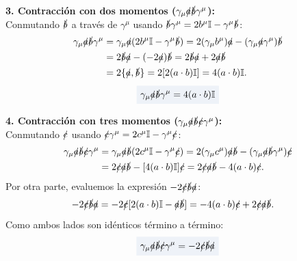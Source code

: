 \documentclass[10pt,a4paper]{article}
\newcommand{\dest}[1]{{\setlength{\fboxsep}{4pt}\colorbox{colordest}{$\displaystyle #1$}}}
\begin{document}
\textbf{3. Contracción con dos momentos ($\gamma_\mu \slashed{a} \slashed{b} \gamma^\mu$):}\\
Conmutando $\slashed{b}$ a través de $\gamma^\mu$ usando $\slashed{b} \gamma^\mu = 2 b^\mu \mathbb{I} - \gamma^\mu \slashed{b}$:
\begin{align}
\gamma_\mu \slashed{a} \slashed{b} \gamma^\mu &= \gamma_\mu \slashed{a} (2 b^\mu \mathbb{I} - \gamma^\mu \slashed{b}) = 2 (\gamma_\mu b^\mu) \slashed{a} - (\gamma_\mu \slashed{a} \gamma^\mu) \slashed{b} \nonumber \\
&= 2 \slashed{b} \slashed{a} - (-2 \slashed{a}) \slashed{b} = 2 \slashed{b} \slashed{a} + 2 \slashed{a} \slashed{b} \nonumber \\
&= 2 \{\slashed{a}, \slashed{b}\} = 2 [2 (a \cdot b) \mathbb{I}] = 4 (a \cdot b) \mathbb{I}.
\end{align}
\begin{equation}
\dest{\gamma_\mu \slashed{a} \slashed{b} \gamma^\mu = 4 (a \cdot b) \mathbb{I}}
\label{eq:clifford_contract_2}
\end{equation}

\textbf{4. Contracción con tres momentos ($\gamma_\mu \slashed{a} \slashed{b} \slashed{c} \gamma^\mu$):}\\
Conmutando $\slashed{c}$ usando $\slashed{c} \gamma^\mu = 2 c^\mu \mathbb{I} - \gamma^\mu \slashed{c}$:
\begin{align}
\gamma_\mu \slashed{a} \slashed{b} \slashed{c} \gamma^\mu &= \gamma_\mu \slashed{a} \slashed{b} (2 c^\mu \mathbb{I} - \gamma^\mu \slashed{c}) = 2 (\gamma_\mu c^\mu) \slashed{a} \slashed{b} - (\gamma_\mu \slashed{a} \slashed{b} \gamma^\mu) \slashed{c} \nonumber \\
&= 2 \slashed{c} \slashed{a} \slashed{b} - [4 (a \cdot b) \mathbb{I}] \slashed{c} = 2 \slashed{c} \slashed{a} \slashed{b} - 4 (a \cdot b) \slashed{c}.
\end{align}
Por otra parte, evaluemos la expresión $-2 \slashed{c} \slashed{b} \slashed{a}$:
\begin{align}
-2 \slashed{c} \slashed{b} \slashed{a} &= -2 \slashed{c} [2 (a \cdot b) \mathbb{I} - \slashed{a} \slashed{b}] = -4 (a \cdot b) \slashed{c} + 2 \slashed{c} \slashed{a} \slashed{b}.
\end{align}
Como ambos lados son idénticos término a término:
\begin{equation}
\dest{\gamma_\mu \slashed{a} \slashed{b} \slashed{c} \gamma^\mu = -2 \slashed{c} \slashed{b} \slashed{a}}
\label{eq:clifford_contract_3}
\end{equation}
\end{document}
